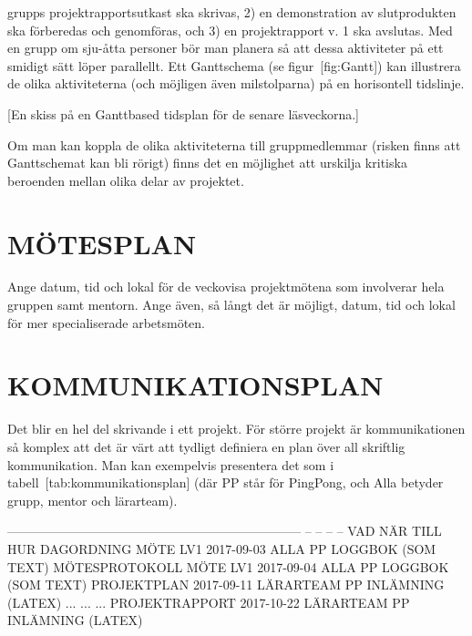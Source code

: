 \documentclass[a4paper]{article}
\begin{document}
grupps projektrapportsutkast ska
skrivas, 2) en demonstration av slutprodukten ska förberedas och
genomföras, och 3) en projektrapport v. 1 ska avslutas. Med en grupp om
sju-åtta personer bör man planera så att dessa aktiviteter på ett
smidigt sätt löper parallellt. Ett Ganttschema (se figur [fig:Gantt])
kan illustrera de olika aktiviteterna (och möjligen även milstolparna)
på en horisontell tidslinje.

[En skiss på en Ganttbased tidsplan för de senare läsveckorna.]

Om man kan koppla de olika aktiviteterna till gruppmedlemmar (risken
finns att Ganttschemat kan bli rörigt) finns det en möjlighet att
urskilja kritiska beroenden mellan olika delar av projektet.


\section{MÖTESPLAN}



Ange datum, tid och lokal för de veckovisa projektmötena som involverar
hela gruppen samt mentorn. Ange även, så långt det är möjligt, datum,
tid och lokal för mer specialiserade arbetsmöten.



\section{KOMMUNIKATIONSPLAN}


Det blir en hel del skrivande i ett projekt. För större projekt är
kommunikationen så komplex att det är värt att tydligt definiera en plan
över all skriftlig kommunikation. Man kan exempelvis presentera det som
i tabell [tab:kommunikationsplan] (där PP står för PingPong, och Alla
betyder grupp, mentor och lärarteam).

  --------------------------------------------------------------------- -- -- -- --
  VAD  NÄR  TILL  HUR                                                         
  DAGORDNING MÖTE LV1  2017-09-03  ALLA  PP LOGGBOK (SOM TEXT)                
  MÖTESPROTOKOLL MÖTE LV1  2017-09-04  ALLA  PP LOGGBOK (SOM TEXT)            
  PROJEKTPLAN  2017-09-11  LÄRARTEAM  PP INLÄMNING (LATEX)                    
  ...  ...  ...                                                               
  PROJEKTRAPPORT  2017-10-22  LÄRARTEAM  PP INLÄMNING (LATEX)                 
                                                                                 
\end{document}
